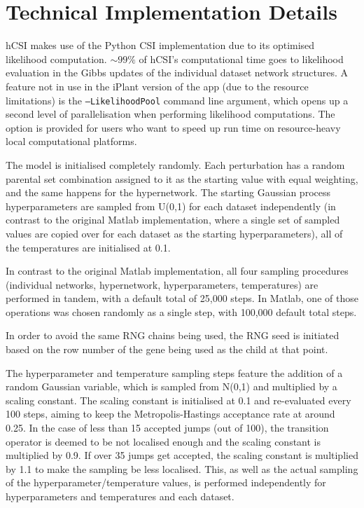 \documentclass{article}
\begin{document}
\section{Technical Implementation Details}

hCSI makes use of the Python CSI implementation due to its optimised likelihood computation. $\sim99\%$ of hCSI's computational time goes to likelihood evaluation in the Gibbs updates of the individual dataset network structures. A feature not in use in the iPlant version of the app (due to the resource limitations) is the \texttt{--LikelihoodPool} command line argument, which opens up a second level of parallelisation when performing likelihood computations. The option is provided for users who want to speed up run time on resource-heavy local computational platforms.

The model is initialised completely randomly. Each perturbation has a random parental set combination assigned to it as the starting value with equal weighting, and the same happens for the hypernetwork. The starting Gaussian process hyperparameters are sampled from U(0,1) for each dataset independently (in contrast to the original Matlab implementation, where a single set of sampled values are copied over for each dataset as the starting hyperparameters), all of the temperatures are initialised at 0.1.

In contrast to the original Matlab implementation, all four sampling procedures (individual networks, hypernetwork, hyperparameters, temperatures) are performed in tandem, with a default total of 25,000 steps. In Matlab, one of those operations was chosen randomly as a single step, with 100,000 default total steps.

In order to avoid the same RNG chains being used, the RNG seed is initiated based on the row number of the gene being used as the child at that point.

The hyperparameter and temperature sampling steps feature the addition of a random Gaussian variable, which is sampled from N(0,1) and multiplied by a scaling constant. The scaling constant is initialised at 0.1 and re-evaluated every 100 steps, aiming to keep the Metropolis-Hastings acceptance rate at around 0.25. In the case of less than 15 accepted jumps (out of 100), the transition operator is deemed to be not localised enough and the scaling constant is multiplied by 0.9. If over 35 jumps get accepted, the scaling constant is multiplied by 1.1 to make the sampling be less localised. This, as well as the actual sampling of the hyperparameter/temperature values, is performed independently for hyperparameters and temperatures and each dataset.





\end{document}
